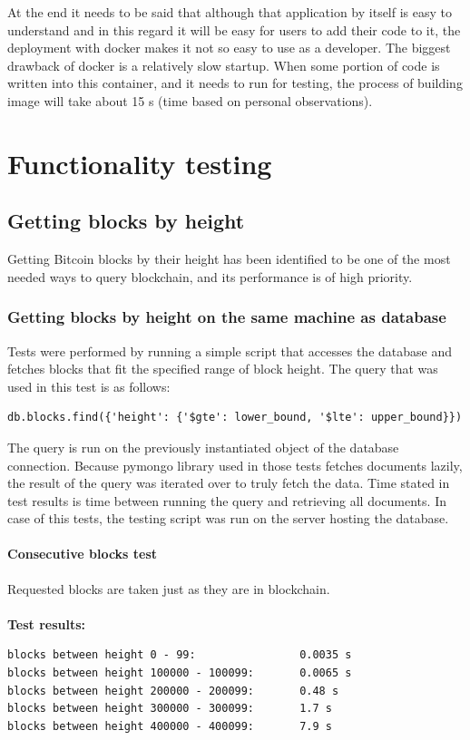 \documentclass[12pt, en, eng, twoside, final]{mgr}
\begin{document}
At the end it needs to be said that although that application by itself is easy to understand and in this regard it will be easy for users to add their code to it, the deployment with docker makes it not so easy to use as a developer. The biggest drawback of docker is a relatively slow startup. When some portion of code is written into this container, and it needs to run for testing, the process of building image will take about 15 s (time based on personal observations).

\chapter{Functionality testing}

\section{Getting blocks by height}
Getting Bitcoin blocks by their height has been identified to be one of the most needed ways to query blockchain, and its performance is of high priority.

 
\subsection{Getting blocks by height on the same machine as database} 
Tests were performed by running a simple script that accesses the database and fetches blocks that fit the specified range of block height. The query that was used in this test is as follows: 
\begin{verbatim}
db.blocks.find({'height': {'$gte': lower_bound, '$lte': upper_bound}})
\end{verbatim}
The query is run on the previously instantiated object of the database connection. Because pymongo library used in those tests fetches documents lazily, the result of the query was iterated over to truly fetch the data. Time stated in test results is time between running the query and retrieving all documents. In case of this tests, the testing script was run on the server hosting the database.

\subsubsection{Consecutive blocks test}
Requested blocks are taken just as they are in blockchain.
\\
\\
\textbf{Test results:}
\begin{verbatim}
blocks between height 0 - 99:                0.0035 s
blocks between height 100000 - 100099:       0.0065 s
blocks between height 200000 - 200099:       0.48 s
blocks between height 300000 - 300099:       1.7 s
blocks between height 400000 - 400099:       7.9 s
\end{verbatim}
\end{document}

